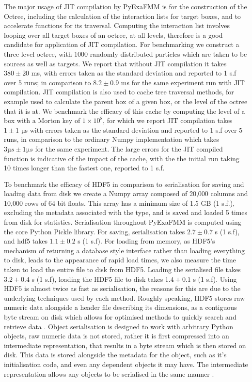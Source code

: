 The major usage of \gls{JIT} compilation by \gls{PyExaFMM} is for the construction
of the Octree, including the calculation of the interaction lists for target
boxes, and to accelerate functions for its traversal. Computing the interaction list
involves looping over all target boxes of an octree, at all levels, therefore
is a good candidate for application of \gls{JIT} compilation. For benchmarking
we construct a three level octree, with 1000 randomly distributed particles which are
taken to be sources as well as targets. We report that without \gls{JIT} compilation
it takes $380 \pm 20$ ms, with errors taken as the standard deviation
and reported to 1 s.f over 5 runs; in comparison
to $8.2 \pm 0.9$ ms for the same experiment run with \gls{JIT} compilation.
\gls{JIT} compilation is also used to cache tree traversal methods, for example
used to calculate the parent box of a given box, or the level of the octree that
it is at. We benchmark the efficacy of this cache by computing the level
of a box with a Morton key of $1 \times 10^8$, for which we report \gls{JIT} compilation
takes $1 \pm 1$ µs with errors taken as the standard deviation and reported
to 1 s.f over 5 runs, in comparison to the ordinary Numpy implementation which takes
$3 µs ± 1 µs$ for the same experiment. The large errors for the \gls{JIT} compiled
function is indicative of the impact of the cache, with the the initial
run taking 10 times longer than the fastest one, reported to 1 s.f.

To benchmark the efficacy of HDF5 in comparison to serialisation for saving
and loading data from disk we create a Numpy array composed of
20,000 columns and 10,000 rows of 64 bit floats. This array has a minimum size
of 1.5 GB (1 s.f.), excluding the metadata associated with the type, and is
saved and loaded 5 times from disk for statistics. Serialisation throughout
\gls{PyExaFMM} is computed using the core Python Pickle library. For saving,
serialisation takes $2.7 \pm 0.7$ s (1 s.f), and hdf5 takes $1.1 \pm 0.2$ s (1 s.f).
For loading from memory, as HDF5's mechanism of returning a database style interface
rather than loading everything to disk, leads to the appearance of rapid
load times, we also measure the time taken to load the entire file to disk from
HDF5. Loading the serialised file takes $3.2 \pm 0.4$ s (1 s.f), loading
the HDF5 file to disk takes $1.4 \pm 0.1$ s (1 s.f). Using HDF5 is almost
twice as fast as serialisation, the reasons for this are due to the underlying
techniques used by each method. Roughly speaking, HDF5 stores raw numeric data
alongside a header file describing its dimensions, as a contiguous byte stream
on disk which allows for optimised methods to quickly search and retrieve data
\cite{collette2013python}. Object serialisation is designed to work with arbitrary
Python objects, raw numeric data is not stored, rather it is first compressed
into an intermediate representation, that results in a byte stream which is then
stored on disk. This data is stored alongside the metadata for the object, such
as it's initialisation code, and even any dependent objects it may have. The
intermediate representation allows any objects to be serialised in the same
manner \cite{pickle}.

